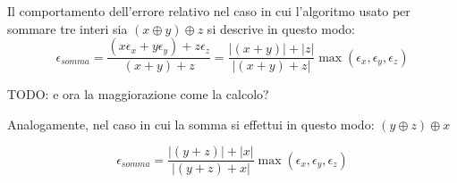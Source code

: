 Il comportamento dell'errore relativo nel caso in cui l'algoritmo usato per sommare tre interi sia \((x \oplus y) \oplus z\) si descrive in questo modo:
\[
\epsilon_{somma} = \frac{(x \epsilon_x + y \epsilon_y) + z \epsilon_z}{(x+y)+z} = \frac{|(x+y)| + |z|}{|(x+y)+z|} \max(\epsilon_x, \epsilon_y, \epsilon_z)
\]

TODO: e ora la maggiorazione come la calcolo?

Analogamente, nel caso in cui la somma si effettui in questo modo: \((y \oplus z) \oplus x\)

\[
\epsilon_{somma} = \frac{ |(y+z)| + |x| }{|(y+z) + x|}\max(\epsilon_x, \epsilon_y, \epsilon_z)
\]
